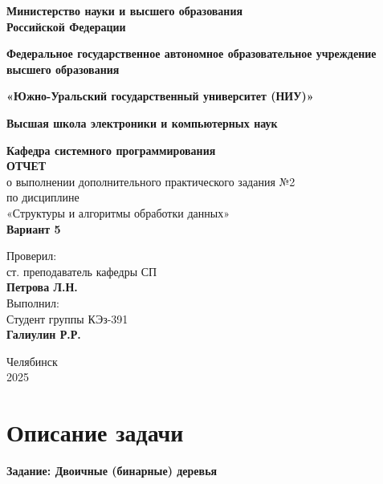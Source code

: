 \documentclass[a4paper,12pt]{article}
\begin{document}
	\begin{titlepage}
		\begin{center}
			{\large \textbf{Министерство науки и высшего образования \\ Российской Федерации}}
			
			{\large\textbf{Федеральное государственное автономное образовательное учреждение высшего образования}}
			
			{\large \textbf{«Южно-Уральский государственный университет (НИУ)»}}
			
			{\large \textbf{Высшая школа электроники и компьютерных наук}}
			
			{\large \textbf{Кафедра системного программирования}\\[2cm]
			}
			\textbf{ОТЧЕТ}\\[0.2cm]
			о выполнении дополнительного практического задания №2\\[0.2cm]
			по дисциплине\\[0.2cm]
			«Структуры и алгоритмы обработки данных»\\[0.2cm]
			\textbf{Вариант 5}\\[3cm]
		\end{center}
		
		\begin{flushright}
			Проверил:\\[0.2cm]
			ст. преподаватель кафедры СП\\[0.2cm]
			\textbf{Петрова Л.Н.}\\[1cm]
						
			Выполнил:\\[0.2cm]
			Студент группы КЭз-391\\[0.2cm]
			\textbf{Галиулин Р.Р.}\\[0.2cm]
			
		\end{flushright}
		\vfill{}
		
		\begin{center}
			Челябинск \\ 2025
		\end{center}
	\end{titlepage}
	\newpage
	
	\tableofcontents
	
	\setcounter{page}{2}
	\newpage
	\section{Описание задачи}
	\textbf{Задание: Двоичные (бинарные) деревья}
	
\end{document}
